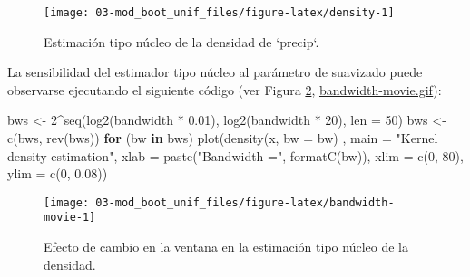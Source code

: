 \documentclass[
]{book}
\newenvironment{Shaded}{\begin{snugshade}}{\end{snugshade}}
\newcommand{\AttributeTok}[1]{\textcolor[rgb]{0.77,0.63,0.00}{#1}}
\newcommand{\ControlFlowTok}[1]{\textcolor[rgb]{0.13,0.29,0.53}{\textbf{#1}}}
\newcommand{\DecValTok}[1]{\textcolor[rgb]{0.00,0.00,0.81}{#1}}
\newcommand{\FloatTok}[1]{\textcolor[rgb]{0.00,0.00,0.81}{#1}}
\newcommand{\FunctionTok}[1]{\textcolor[rgb]{0.00,0.00,0.00}{#1}}
\newcommand{\NormalTok}[1]{#1}
\newcommand{\OtherTok}[1]{\textcolor[rgb]{0.56,0.35,0.01}{#1}}
\newcommand{\SpecialCharTok}[1]{\textcolor[rgb]{0.00,0.00,0.00}{#1}}
\newcommand{\StringTok}[1]{\textcolor[rgb]{0.31,0.60,0.02}{#1}}
\theoremstyle{break}
\theoremstyle{definition}
\theoremstyle{definition}
\theoremstyle{definition}
\theoremstyle{definition}
\theoremstyle{remark}
\begin{document}
\begin{figure}[!htb]

{\centering \texttt{[image: 03-mod\_boot\_unif\_files/figure-latex/density-1]} 

}

\caption{Estimación tipo núcleo de la densidad de `precip`. }\label{fig:density}
\end{figure}

La sensibilidad del estimador tipo núcleo al parámetro de suavizado puede
observarse ejecutando el siguiente código (ver Figura \ref{fig:bandwidth-movie}, \href{./bandwidth-movie.gif}{bandwidth-movie.gif}):

\begin{Shaded}
\begin{Highlighting}[]
\NormalTok{bws }\OtherTok{\textless{}{-}} \DecValTok{2}\SpecialCharTok{\^{}}\FunctionTok{seq}\NormalTok{(}\FunctionTok{log2}\NormalTok{(bandwidth }\SpecialCharTok{*} \FloatTok{0.01}\NormalTok{), }\FunctionTok{log2}\NormalTok{(bandwidth }\SpecialCharTok{*} \DecValTok{20}\NormalTok{), }\AttributeTok{len =} \DecValTok{50}\NormalTok{)}
\NormalTok{bws }\OtherTok{\textless{}{-}} \FunctionTok{c}\NormalTok{(bws, }\FunctionTok{rev}\NormalTok{(bws))}
\ControlFlowTok{for}\NormalTok{ (bw }\ControlFlowTok{in}\NormalTok{ bws)}
  \FunctionTok{plot}\NormalTok{(}\FunctionTok{density}\NormalTok{(x, }\AttributeTok{bw =}\NormalTok{ bw) , }\AttributeTok{main =} \StringTok{"Kernel density estimation"}\NormalTok{, }
         \AttributeTok{xlab =} \FunctionTok{paste}\NormalTok{(}\StringTok{"Bandwidth ="}\NormalTok{, }\FunctionTok{formatC}\NormalTok{(bw)), }
         \AttributeTok{xlim =} \FunctionTok{c}\NormalTok{(}\DecValTok{0}\NormalTok{, }\DecValTok{80}\NormalTok{), }\AttributeTok{ylim =} \FunctionTok{c}\NormalTok{(}\DecValTok{0}\NormalTok{, }\FloatTok{0.08}\NormalTok{))}
\end{Highlighting}
\end{Shaded}

\begin{figure}[!htb]

{\centering \texttt{[image: 03-mod\_boot\_unif\_files/figure-latex/bandwidth-movie-1]} 

}

\caption{Efecto de cambio en la ventana en la estimación tipo núcleo de la densidad.}\label{fig:bandwidth-movie}
\end{figure}
\end{document}
